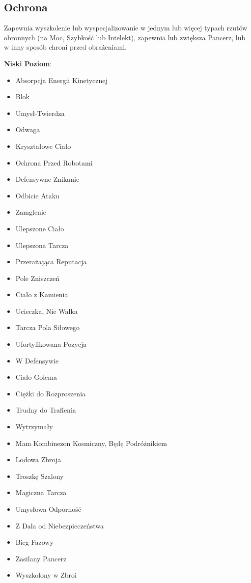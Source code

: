 \subsection{Ochrona} 

Zapewnia wyszkolenie lub wyspecjalizowanie w jednym lub więcej typach rzutów obronnych (na Moc, Szybkość lub Intelekt), zapewnia lub zwiększa Pancerz, lub w inny sposób chroni przed obrażeniami. 

\textbf{Niski Poziom}:

\begin{itemize}
\item Absorpcja Energii Kinetycznej
\item Blok
\item Umysł-Twierdza
\item Odwaga
\item Kryształowe Ciało
\item Ochrona Przed Robotami
\item Defensywne Znikanie
\item Odbicie Ataku
\item Zamglenie
\item Ulepszone Ciało
\item Ulepszona Tarcza
\item Przerażająca Reputacja
\item Pole Zniszczeń
\item Ciało z Kamienia
\item Ucieczka, Nie Walka
\item Tarcza Pola Siłowego
\item Ufortyfikowana Pozycja
\item W Defensywie
\item Ciało Golema
\item Ciężki do Rozproszenia
\item Trudny do Trafienia
\item Wytrzymały
\item Mam Kombinezon Kosmiczny, Będę Podróżnikiem
\item Lodowa Zbroja
\item Troszkę Szalony
\item Magiczna Tarcza
\item Umysłowa Odporność
\item Z Dala od Niebezpieczeństwa
\item Bieg Fazowy
\item Zasilany Pancerz
\item Wyszkolony w Zbroi

\end{itemize}

